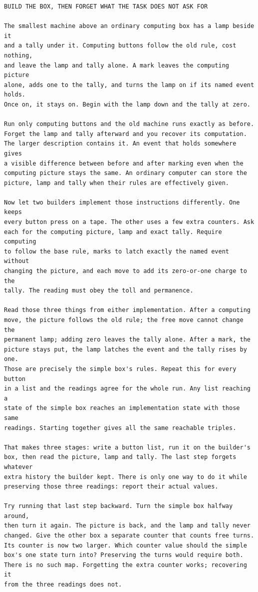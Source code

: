 \documentclass[11pt,twoside]{article}
\theoremstyle{thielethm}
\theoremstyle{thieledef}
\theoremstyle{thieledef}
\theoremstyle{thieledef}
\theoremstyle{thielethm}
\theoremstyle{thieleobs}
\theoremstyle{thielethm}
\begin{document}
\begin{small}\begin{verbatim}
BUILD THE BOX, THEN FORGET WHAT THE TASK DOES NOT ASK FOR

The smallest machine above an ordinary computing box has a lamp beside it
and a tally under it. Computing buttons follow the old rule, cost nothing,
and leave the lamp and tally alone. A mark leaves the computing picture
alone, adds one to the tally, and turns the lamp on if its named event holds.
Once on, it stays on. Begin with the lamp down and the tally at zero.

Run only computing buttons and the old machine runs exactly as before.
Forget the lamp and tally afterward and you recover its computation.
The larger description contains it. An event that holds somewhere gives
a visible difference between before and after marking even when the
computing picture stays the same. An ordinary computer can store the
picture, lamp and tally when their rules are effectively given.

Now let two builders implement those instructions differently. One keeps
every button press on a tape. The other uses a few extra counters. Ask
each for the computing picture, lamp and exact tally. Require computing
to follow the base rule, marks to latch exactly the named event without
changing the picture, and each move to add its zero-or-one charge to the
tally. The reading must obey the toll and permanence.

Read those three things from either implementation. After a computing
move, the picture follows the old rule; the free move cannot change the
permanent lamp; adding zero leaves the tally alone. After a mark, the
picture stays put, the lamp latches the event and the tally rises by one.
Those are precisely the simple box's rules. Repeat this for every button
in a list and the readings agree for the whole run. Any list reaching a
state of the simple box reaches an implementation state with those same
readings. Starting together gives all the same reachable triples.

That makes three stages: write a button list, run it on the builder's
box, then read the picture, lamp and tally. The last step forgets whatever
extra history the builder kept. There is only one way to do it while
preserving those three readings: report their actual values.

Try running that last step backward. Turn the simple box halfway around,
then turn it again. The picture is back, and the lamp and tally never
changed. Give the other box a separate counter that counts free turns.
Its counter is now two larger. Which counter value should the simple
box's one state turn into? Preserving the turns would require both.
There is no such map. Forgetting the extra counter works; recovering it
from the three readings does not.


\end{verbatim}
\end{small}
\end{document}
